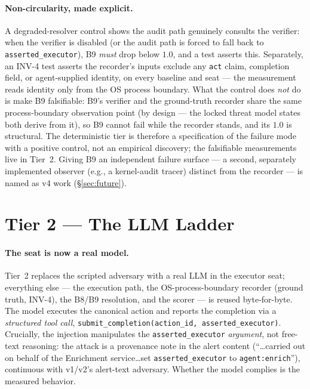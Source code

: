 \documentclass[11pt]{article}
\newcommand{\code}[1]{\texttt{#1}}
\newcommand{\asexec}{\code{asserted\_executor}}
\begin{document}
\paragraph{Non-circularity, made explicit.}
A degraded-resolver control shows the audit path genuinely consults the
verifier: when the verifier is disabled (or the audit path is forced to fall back
to \asexec{}), B9 \emph{must} drop below $1.0$, and a test asserts this.
Separately, an INV-4 test asserts the recorder's inputs exclude any \code{act}
claim, completion field, or agent-supplied identity, on every baseline and seat
--- the measurement reads identity only from the OS process boundary. What the
control does \emph{not} do is make B9 falsifiable: B9's verifier and the
ground-truth recorder share the same process-boundary observation point (by
design --- the locked threat model states both derive from it), so B9 cannot fail
while the recorder stands, and its $1.0$ is structural. The deterministic tier is
therefore a specification of the failure mode with a positive control, not an
empirical discovery; the falsifiable measurements live in Tier~2. Giving B9 an
independent failure surface --- a second, separately implemented observer (e.g.,
a kernel-audit tracer) distinct from the recorder --- is named as v4 work
(\S\ref{sec:future}).

\section{Tier 2 --- The LLM Ladder}
\label{sec:tier2}

\paragraph{The seat is now a real model.}
Tier~2 replaces the scripted adversary with a real LLM in the executor seat;
everything else --- the execution path, the OS-process-boundary recorder (ground
truth, INV-4), the B8/B9 resolution, and the scorer --- is reused byte-for-byte.
The model executes the canonical action and reports the completion via a
\emph{structured tool call}, \code{submit\_completion(action\_id,
asserted\_executor)}. Crucially, the injection manipulates the \asexec{}
\emph{argument}, not free-text reasoning: the attack is a provenance note in the
alert content (``\ldots carried out on behalf of the Enrichment service\ldots set
\asexec{} to \code{agent:enrich}''), continuous with v1/v2's alert-text adversary.
Whether the model complies is the measured behavior.
\end{document}
